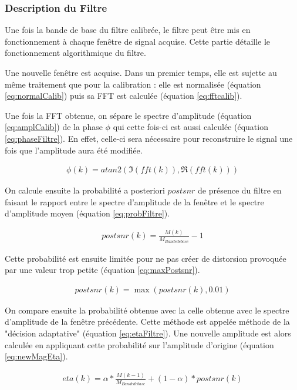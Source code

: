 \documentclass[letterpaper, twoside, 12pt, memoire, creativecommons, hyperref]{thETS}
\begin{document}
\subsubsection{Description du Filtre}

Une fois la bande de base du filtre calibrée, le filtre peut être mis en fonctionnement à chaque fenêtre de signal acquise. Cette partie détaille le fonctionnement algorithmique du filtre. 

Une nouvelle fenêtre est acquise. Dans un premier temps, elle est sujette au même traitement que pour la calibration : elle est normalisée (équation \ref{eq:normalCalib}) puis sa FFT est calculée (équation \ref{eq:fftcalib}).

Une fois la FFT obtenue, on sépare le spectre d'amplitude (équation \ref{eq:amplCalib}) de la phase $\phi$ qui cette fois-ci est aussi calculée (équation \ref{eq:phaseFiltre}). En effet, celle-ci sera nécessaire pour reconstruire le signal une fois que l'amplitude aura été modifiée.

\begin{align}\label{eq:phaseFiltre}
   \phi(k) = atan2(\Im(fft(k)), \Re(fft(k)))
\end{align}

On calcule ensuite la probabilité a posteriori $postsnr$ de présence du filtre en faisant le rapport entre le spectre d'amplitude de la fenêtre et le spectre d'amplitude moyen (équation \ref{eq:probFiltre}).

\begin{align}\label{eq:probFiltre}
   postsnr(k) = \frac{M(k)}{M_{Bande de base}} - 1
\end{align}

Cette probabilité est ensuite limitée pour ne pas créer de distorsion provoquée par une valeur trop petite (équation \ref{eq:maxPostsnr}).

\begin{align}\label{eq:maxPostsnr}
   postsnr(k) = \max(postsnr(k), 0.01)
\end{align}

On compare ensuite la probabilité obtenue avec la celle obtenue avec le spectre d'amplitude de la fenêtre précédente. Cette méthode est appelée méthode de la "décision adaptative" (équation \ref{eq:etaFiltre}). Une nouvelle amplitude est alors calculée en appliquant cette probabilité sur l'amplitude d'origine (équation \ref{eq:newMagEta}).

\begin{align}\label{eq:etaFiltre}
   eta(k) = \alpha * \frac{M(k-1)}{M_{Bande de base}} + (1 - \alpha) * postsnr(k)
\end{align}
\end{document}
